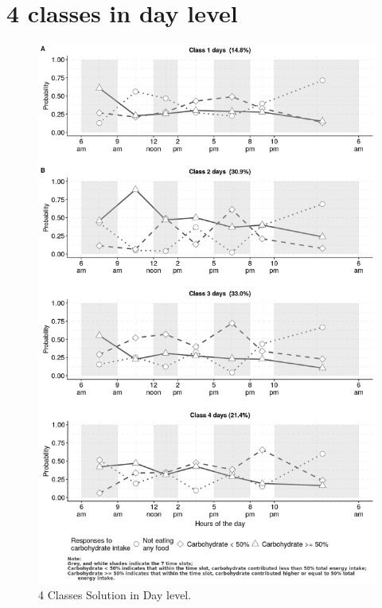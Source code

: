 \section{4 classes in day level}

\begin{figure}[H]
	\centering
	\includegraphics[width=15cm]{Figures/CW4level1.png}
	\decoRule
	\caption[2 Classes Solution in Day level]{4 Classes Solution in Day level.}
	\label{fig:diary1}
\end{figure}

